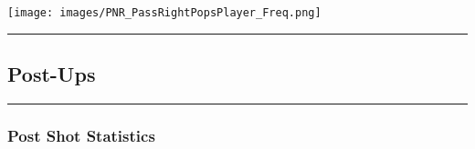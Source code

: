 \documentclass[a4paper,12pt]{article}
\begin{document}
\begin{table}[H]
{\begin{minipage}[t]{0.6\textwidth}
{\begin{tabular}
{{{{{{{{{{{{            \bottomrule
        \end{tabular}
        } %
    \end{minipage}
    } %
    \hfill %
    \begin{minipage}[c]{0.35\textwidth} %
        \flushright
        \texttt{[image: images/PNR\_PassRightPopsPlayer\_Freq.png]} %
    \end{minipage}
\end{table}

\vspace{-1em} %
\hrule height 1pt width 1\textwidth %
\vspace{1em} %

\clearpage

\subsection{Post-Ups}

\vspace{1em} %
\hrule height 1pt width 1\textwidth %
\vspace{0em} %

\subsubsection{Post Shot Statistics}
\end{document}
